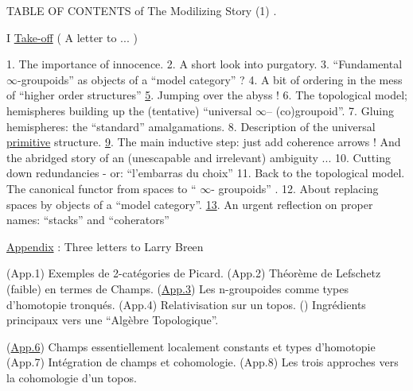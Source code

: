 

TABLE OF CONTENTS of The Modilizing Story (1) .

I \uline{Take-off} ( A letter to ... )

1. The importance of innocence.
2. A short look into purgatory.
3. ``Fundamental $\infty$-groupoids'' as objects of a ``model category'' ?
4. A bit of ordering in the mess of ``higher order structures''
\uline{5}. Jumping over the abyss !
6. The topological model; hemispheres building up the (tentative)
``universal $\infty$-- (co)groupoid''.
7. Gluing hemispheres: the ``standard'' amalgamations.
8. Description of the universal \uline{primitive} structure.
\uline{9}. The main inductive step: just add coherence arrows ! And the
abridged story of an (unescapable and irrelevant) ambiguity ...
10. Cutting down redundancies - or: ``l'embarras du choix''
\unsure{\hand{\textasciicircum}}11. Back to the topological model. The canonical functor from
spaces to `` $\infty$- groupoids'' .
12. About replacing spaces by objects of a ``model category''.
\uline{13}. An urgent reflection on proper names: ``stacks'' and ``coherators''

\uline{Appendix} : Three letters to Larry Breen

(App.1) Exemples de 2-catégories de Picard.
(App.2)  Théorème de Lefschetz (faible) en termes de \hand{(}Champs.\hand{)}
(\uline{App.3}) Les n-groupoides comme types d'homotopie tronqués.
(App.4) Relativisation sur un topos.
() Ingrédients principaux vers une ``Algèbre Topologique''.

(\uline{App.6}) Champs essentiellement localement constants et types d'homoto\hand{(}pie
(App.7) Intégration de champs et cohomologie.
(App.8) Les trois approches vers la cohomologie d'un topos.

